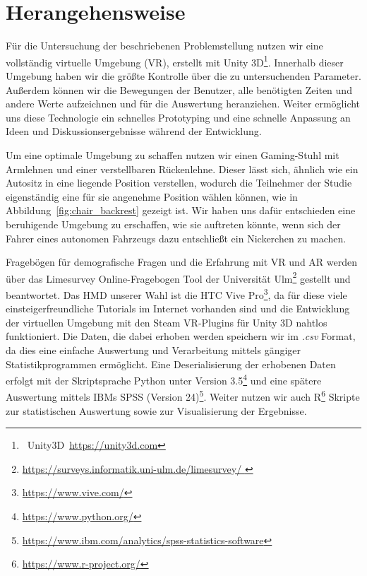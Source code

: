 \section{Herangehensweise}\label{sec:approach}  

Für die Untersuchung der beschriebenen Problemstellung nutzen wir eine vollständig virtuelle Umgebung (VR), erstellt mit Unity 3D\footnote{~Unity3D~\url{https://unity3d.com}}. Innerhalb dieser Umgebung haben wir die größte Kontrolle über die zu untersuchenden Parameter. Außerdem können wir die Bewegungen der Benutzer, alle benötigten Zeiten und andere Werte aufzeichnen und für die Auswertung heranziehen. Weiter ermöglicht uns diese Technologie ein schnelles Prototyping und eine schnelle Anpassung an Ideen und Diskussionsergebnisse während der Entwicklung.

Um eine optimale Umgebung zu schaffen nutzen wir einen Gaming-Stuhl mit Armlehnen und einer verstellbaren Rückenlehne. Dieser lässt sich, ähnlich wie ein Autositz in eine liegende Position verstellen, wodurch die Teilnehmer der Studie eigenständig eine für sie angenehme Position wählen können, wie in Abbildung~\ref{fig:chair_backrest} gezeigt ist. Wir haben uns dafür entschieden eine beruhigende Umgebung zu erschaffen, wie sie auftreten könnte, wenn sich der Fahrer eines autonomen Fahrzeugs dazu entschließt ein Nickerchen zu machen.


Fragebögen für demografische Fragen und die Erfahrung mit VR und AR werden über das Limesurvey Online-Fragebogen Tool der Universität Ulm\footnote{\url{https://surveys.informatik.uni-ulm.de/limesurvey/
}} gestellt und beantwortet.
Das HMD unserer Wahl ist die HTC Vive Pro\footnote{\url{https://www.vive.com/}}, da für diese viele einsteigerfreundliche Tutorials im Internet vorhanden sind und die Entwicklung der virtuellen Umgebung mit den Steam VR-Plugins für Unity 3D nahtlos funktioniert. Die Daten, die dabei erhoben werden speichern wir im \textit{.csv} Format, da dies eine einfache Auswertung und Verarbeitung mittels gängiger Statistikprogrammen ermöglicht. Eine Deserialisierung der erhobenen Daten erfolgt mit der Skriptsprache Python unter Version 3.5\footnote{\url{https://www.python.org/}} und eine spätere Auswertung mittels IBMs SPSS (Version 24)\footnote{\url{https://www.ibm.com/analytics/spss-statistics-software}}. Weiter nutzen wir auch R\footnote{\url{https://www.r-project.org/}} Skripte zur statistischen Auswertung sowie zur Visualisierung der Ergebnisse.
